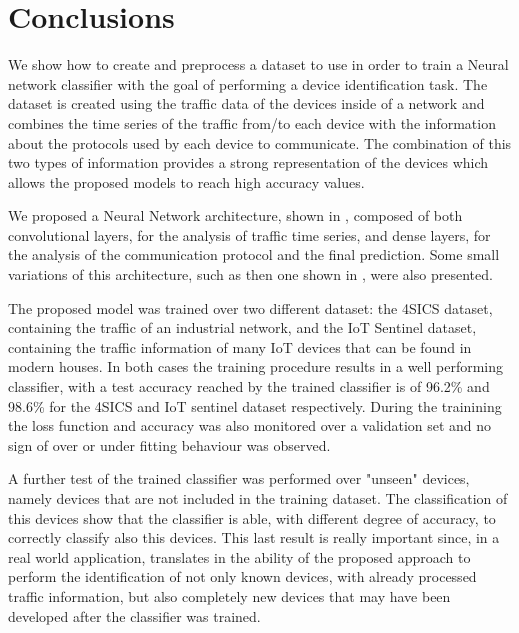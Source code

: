 \chapter{Conclusions}

We show how to create and preprocess a dataset to use in order to train a Neural network classifier with the goal of performing a device identification task. The dataset is created using the traffic data of the devices inside of a network and combines the time series of the traffic from/to each device with the information about the protocols used by each device to communicate.
The combination of this two types of information provides a strong representation of the devices which allows the proposed models to reach high accuracy values.

We proposed a Neural Network architecture, shown in , composed of both convolutional layers, for the analysis of traffic time series, and dense layers, for the analysis of the communication protocol and the final prediction. Some small variations of this architecture, such as then one shown in , were also presented. 

The proposed model was trained over two different dataset: the 4SICS dataset, containing the traffic of an industrial network, and the IoT Sentinel dataset, containing the traffic information of many IoT devices that can be found in modern houses. In both cases the training procedure results in a well performing classifier, with a test  accuracy reached by the trained classifier is of 96.2\% and 98.6\% for the 4SICS and IoT sentinel dataset respectively. During the trainining the loss function and accuracy was also monitored over a validation set and no sign of over or under fitting behaviour was observed.

A further test of the trained classifier was performed over "unseen" devices, namely devices that are not included in the training dataset. The classification of this devices show that the classifier is able, with different degree of accuracy, to correctly classify also this devices. This last result is really important since, in a real world application, translates in the ability of the proposed approach to perform the identification of not only known devices, with already processed traffic information, but also completely new devices that may have been developed after the classifier was trained.


